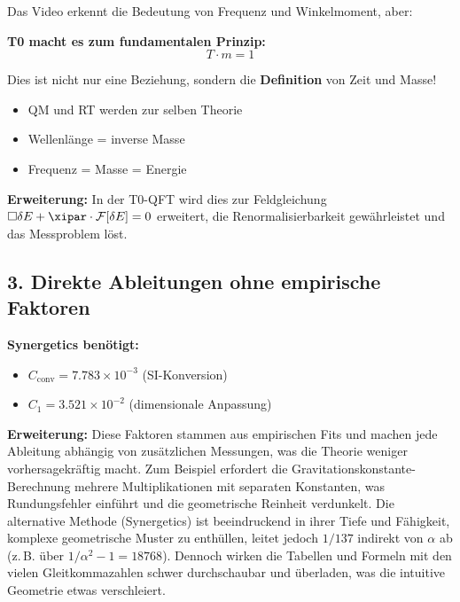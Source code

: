 	Das Video erkennt die Bedeutung von Frequenz und Winkelmoment, aber:
	
	\begin{vorteil}
		\textbf{T0 macht es zum fundamentalen Prinzip:}
		\begin{equation}
			\boxed{T \cdot m = 1}
		\end{equation}
		
		Dies ist nicht nur eine Beziehung, sondern die \textbf{Definition} von Zeit und Masse!
		\begin{itemize}
			\item QM und RT werden zur selben Theorie
			\item Wellenlänge = inverse Masse
			\item Frequenz = Masse = Energie
		\end{itemize}
		
		\textbf{Erweiterung:} In der T0-QFT wird dies zur Feldgleichung $\square \delta E + \xipar \cdot \mathcal{F}[\delta E] = 0$ erweitert, die Renormalisierbarkeit gewährleistet und das Messproblem löst.
	\end{vorteil}
	
	\subsection{3. Direkte Ableitungen ohne empirische Faktoren}
	
	\textbf{Synergetics benötigt:}
	\begin{itemize}
		\item $C_{\text{conv}} = 7.783 \times 10^{-3}$ (SI-Konversion)
		\item $C_1 = 3.521 \times 10^{-2}$ (dimensionale Anpassung)
	\end{itemize}
	
	\textbf{Erweiterung:} Diese Faktoren stammen aus empirischen Fits und machen jede Ableitung abhängig von zusätzlichen Messungen, was die Theorie weniger vorhersagekräftig macht. Zum Beispiel erfordert die Gravitationskonstante-Berechnung mehrere Multiplikationen mit separaten Konstanten, was Rundungsfehler einführt und die geometrische Reinheit verdunkelt. Die alternative Methode (Synergetics) ist beeindruckend in ihrer Tiefe und Fähigkeit, komplexe geometrische Muster zu enthüllen, leitet jedoch $1/137$ indirekt von $\alpha$ ab (z.\,B. über $1/\alpha^2 - 1 = 18768$). Dennoch wirken die Tabellen und Formeln mit den vielen Gleitkommazahlen schwer durchschaubar und überladen, was die intuitive Geometrie etwas verschleiert.
	
